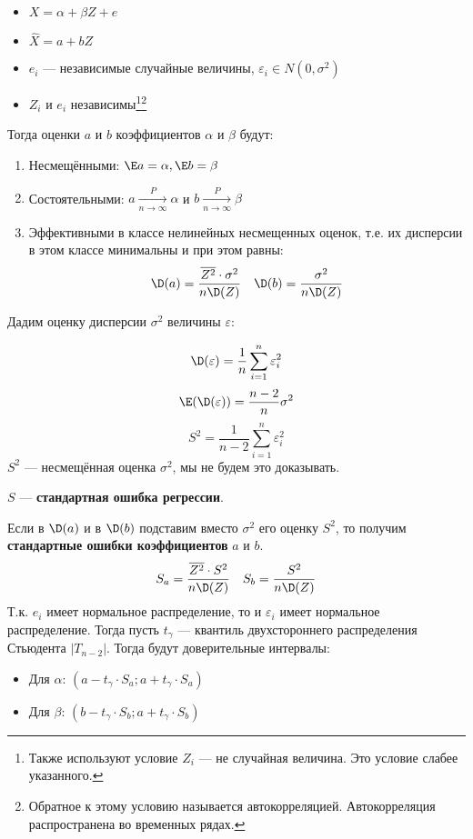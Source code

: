 \begin{theorem}\itemfix
    \label{Гаусса--Маркова}
    \begin{itemize}
        \item \(X = \alpha + \beta Z + e\)
        \item \(\hat{X} = a + bZ\)
        \item \(e_i\) --- независимые случайные величины, \(\varepsilon_i \in N(0, \sigma^2)\)
        \item \(Z_i\) и \(e_i\) независимы\footnote{Также используют условие \(Z_i\) --- не случайная величина. Это условие слабее указанного.}\footnote{Обратное к этому условию называется автокорреляцией. Автокорреляция распространена во временных рядах.}
    \end{itemize}

    Тогда оценки \(a\) и \(b\) коэффициентов \(\alpha\) и \(\beta\) будут:
    \begin{enumerate}
        \item Несмещёнными: \(\E a = \alpha, \E b = \beta\)
        \item Состоятельными: \(a \xrightarrow[n \to \infty]{P} \alpha\) и \(b \xrightarrow[n \to \infty]{P} \beta\)
        \item Эффективными в классе нелинейных несмещенных оценок, т.е. их дисперсии в этом классе минимальны и при этом равны:
              \[\D(a) = \frac{\overline{Z^2} \cdot \sigma^2}{n \D(Z)} \quad \D(b) = \frac{\sigma^2}{n \D(Z)}\]
    \end{enumerate}
\end{theorem}

Дадим оценку дисперсии \(\sigma^2\) величины \(\varepsilon\):

\[\D(\varepsilon) = \frac{1}{n} \sum_{i=1}^{n} \varepsilon_i^2\]
\[\E(\D(\varepsilon)) = \frac{n - 2}{n}\sigma^2\]
\[S^2 = \frac{1}{n - 2}\sum_{i=1}^{n} \varepsilon_i^2\]
\(S^2\) --- несмещённая оценка \(\sigma^2\), мы не будем это доказывать.
\begin{definition}
    \(S\) --- \textbf{стандартная ошибка регрессии}.
\end{definition}
Если в \(\D(a)\) и в \(\D(b)\) подставим вместо \(\sigma^2\) его оценку \(S^2\), то получим \textbf{стандартные ошибки коэффициентов} \(a\) и \(b\).
\[S_a = \frac{\overline{Z^2} \cdot S^2}{n \D(Z)} \quad S_b = \frac{S^2}{n \D(Z)}\]
Т.к. \(e_i\) имеет нормальное распределение, то и \(\varepsilon_i\) имеет нормальное распределение. Тогда пусть \(t_\gamma\) --- квантиль двухстороннего распределения Стьюдента \(|T_{n-2}|\). Тогда будут доверительные интервалы:
\begin{itemize}
    \item Для \(\alpha\): \((a - t_\gamma \cdot S_a; a + t_\gamma \cdot S_a)\)
    \item Для \(\beta\): \((b - t_\gamma \cdot S_b; a + t_\gamma \cdot S_b)\)
\end{itemize}

